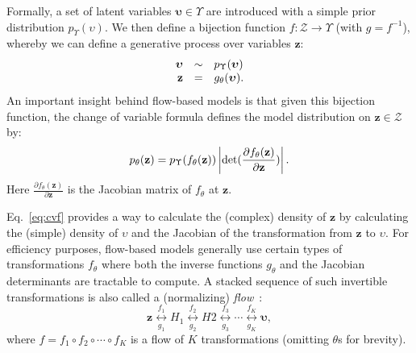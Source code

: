 \documentclass[11pt,a4paper]{article}
\newcommand{\zv}{\mathbf{z}}
\begin{document}
Formally, a set of latent variables $\bm{\upsilon} \in \Upsilon$ are introduced with a simple prior distribution $p_{\Upsilon}(\upsilon)$.
We then define a bijection function $f: \mathcal{Z} \rightarrow \Upsilon$ (with $g = f^{-1}$), whereby we can define a generative process over variables $\zv$:
\begin{equation}
\label{eq:generation}
\begin{array}{rcl}
\bm{\upsilon} & \sim & p_{\Upsilon}(\bm{\upsilon}) \\
\zv & = & g_{\theta}(\bm{\upsilon}).
\end{array}
\vspace{-2mm}
\end{equation}
An important insight behind flow-based models is that given this bijection function, the change of variable formula defines the model distribution on $\zv \in \mathcal{Z}$ by:
\begin{equation}\label{eq:cvf}
p_{\theta}(\zv) = p_{\Upsilon}(f_{\theta}(\zv))\left| \det(\frac{\partial f_{\theta}(\zv)}{\partial \zv})\right|.
\vspace{-2mm}
\end{equation}
Here $\frac{\partial f_{\theta}(\zv)}{\partial \zv}$ is the Jacobian matrix of $f_{\theta}$ at $\zv$.

Eq.~\eqref{eq:cvf} provides a way to calculate the (complex) density of $\zv$ by calculating the (simple) density of $\upsilon$ and the Jacobian of the transformation from $\zv$ to $\upsilon$.
For efficiency purposes, flow-based models generally use certain types of transformations $f_{\theta}$ where both the inverse functions $g_{\theta}$ and the Jacobian determinants are tractable to compute.
A stacked sequence of such invertible transformations is also called a (normalizing) \emph{flow}~\citep{rezende2015variational}:
\begin{displaymath}
\zv \underset{g_1}{\overset{f_1}{\longleftrightarrow}} H_1 \underset{g_2}{\overset{f_2}{\longleftrightarrow}} H2 \underset{g_3}{\overset{f_3}{\longleftrightarrow}} \cdots \underset{g_K}{\overset{f_K}{\longleftrightarrow}} \bm{\upsilon},
\end{displaymath}
where $f = f_1 \circ f_2 \circ \cdots \circ f_K$ is a flow of $K$ transformations (omitting $\theta$s for brevity).
\end{document}
